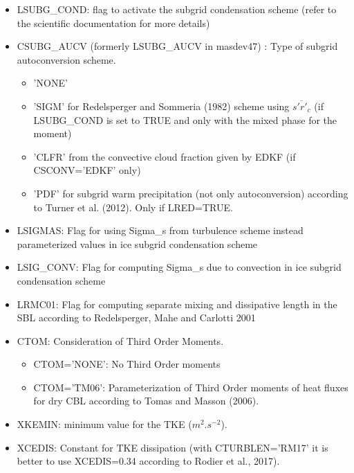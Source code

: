 \begin{itemize}
\item
{}
LSUBG\_COND: flag to activate the subgrid condensation scheme (refer to the scientific 
documentation for more details)

\item
{}
CSUBG\_AUCV (formerly LSUBG\_AUCV in masdev47) : Type of subgrid autoconversion scheme.
\begin{itemize}
\item  'NONE' 
\item 'SIGM' for Redelsperger and Sommeria (1982) scheme using $\overline{s'r'_{c}}$ 
(if LSUBG\_COND
is set to TRUE and only with the mixed phase for the moment)
\item 'CLFR' from the convective cloud fraction given by EDKF 
(if CSCONV='EDKF' only)
\item 'PDF' for subgrid warm precipitation (not only autoconversion) according to Turner et al. (2012). Only if LRED=TRUE.
\end{itemize}

\item
{}
LSIGMAS: Flag for using Sigma\_s from turbulence scheme instead parameterized values
in ice subgrid condensation scheme

\item
{}
LSIG\_CONV: Flag for computing Sigma\_s due to convection in ice subgrid 
condensation scheme

\item
{}
LRMC01: Flag for computing separate mixing and dissipative length
in the SBL according to Redelsperger, Mahe and Carlotti 2001

\item
{}
CTOM: Consideration of Third Order Moments.

\begin{itemize}
\item
CTOM='NONE': No Third Order moments                             
\item
CTOM='TM06': Parameterization of Third Order moments of heat fluxes for dry CBL
according to Tomas and Masson (2006).
\end{itemize}

\item
{}
XKEMIN: minimum value for the TKE ($m^{2}.s^{-2}$).

\item
{}
XCEDIS: Constant for TKE dissipation
(with CTURBLEN='RM17' it is better to use XCEDIS=0.34 according to Rodier et al., 2017).


\end{itemize}
